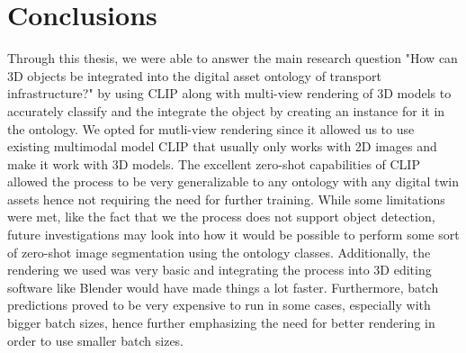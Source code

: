 \documentclass[a4paper,11pt,oneside]{article}
\begin{document}
  \section{Conclusions}
Through this thesis, we were able to answer the main research question "How can 3D objects be integrated into the digital asset ontology of transport infrastructure?" by using CLIP along with multi-view rendering of 3D models to accurately classify and the integrate the object by creating an instance for it in the ontology. We opted for mutli-view rendering since it allowed us to use existing multimodal model CLIP that usually only works with 2D images and make it work with 3D models. The excellent zero-shot capabilities of CLIP allowed the process to be very generalizable to any ontology with any digital twin assets hence not requiring the need for further training. While some limitations were met, like the fact that we the process does not support object detection, future investigations may look into how it would be possible to perform some sort of zero-shot image segmentation using the ontology classes. Additionally, the rendering we used was very basic and integrating the process into 3D editing software like Blender would have made things a lot faster. Furthermore, batch predictions proved to be very expensive to run in some cases, especially with bigger batch sizes, hence further emphasizing the need for better rendering in order to use smaller batch sizes.


  \newpage
  
  
\end{document}
